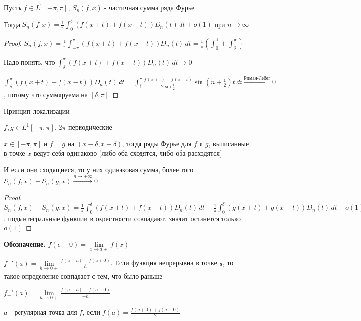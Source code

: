 \begin{consequence}
    Пусть $f \in L^1 [-\pi, \pi]$, $S_n (f, x)$ - частичная сумма ряда Фурье

    Тогда $S_n (f, x) = \frac{1}{\pi} \int_0^\delta (f(x + t) + f(x - t)) D_n (t) \, dt + o(1)$ при $n \to \infty$
\end{consequence}

\begin{proof}
    $S_n (f, x) = \frac{1}{\pi} \int_{-\pi}^\pi (f(x + t) + f(x - t)) D_n (t) \,  dt = \frac{1}{\pi} \left( \int_{0}^\delta + \int_\delta^\pi \right)$

    Надо понять, что $\int_{\delta}^\pi (f(x + t) + f(x - t)) D_n (t) \,  dt \rightarrow 0$

    $\int_{\delta}^\pi (f(x + t) + f(x - t)) D_n (t) \,  dt = \int_\delta^\pi \frac{f(x + t) + f(x - t)}{2 \sin \frac{t}{2}} \sin (n + \frac{1}{2}) t \, dt \overset{\text{Риман-Лебег}}{\rightarrow} 0$, потому что суммируема на $[\delta, \pi]$
\end{proof}

\begin{consequence}
    Принцип локализации

    $f, g \in L^1 [-\pi, \pi]$, $2\pi$ периодические

    $x \in [-\pi, \pi]$ и $f = g$ на $(x - \delta, x + \delta)$, тогда ряды Фурье для $f$ и $g$, выписанные в точке $x$ ведут себя одинаково (либо оба сходятся, либо оба расходятся)

    И если они сходящиеся, то у них одинаковая сумма, более того $S_n (f, x) - S_n (g, x) \overset{n \to +\infty}{\rightarrow} 0$
\end{consequence}

\begin{proof}
    $S_n (f, x) - S_n (g, x) = \frac{1}{\pi} \int_0^\delta (f(x + t) + f(x - t)) D_n (t) \, dt - \frac{1}{\pi} \int_0^\delta (g(x + t) + g(x - t)) D_n (t) \, dt + o(1)$, подынтегральные функции в окрестности совпадают, значит останется только $o(1)$
\end{proof}

\textbf{Обозначение. } $f(a \pm 0) = \lim\limits_{x \to a\pm} f(x)$

$f_+' (a) = \lim\limits_{h \to 0+} \frac{f(a + h) - f(a + 0)}{h}$. Если функция непрерывна в точке $a$, то такое определение совпадает с тем, что было раньше

$f_-' (a) = \lim\limits_{h \to 0+} \frac{f(a - h) - f(a - 0)}{-h}$

\begin{definition}
    $a$ - регулярная точка для $f$, если $f(a) = \frac{f(a + 0) + f(a - 0)}{2}$
\end{definition}

